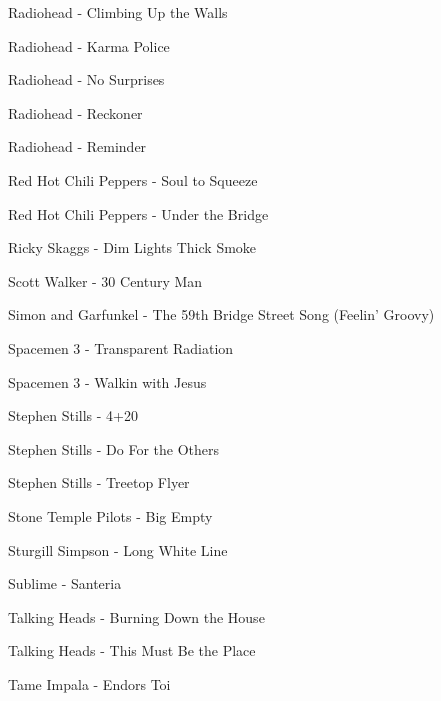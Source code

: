 Radiohead - Climbing Up the Walls \dotfill \pageref{Climbing Up the Walls - Radiohead} 

Radiohead - Karma Police \dotfill \pageref{Karma Police - Radiohead} 

Radiohead - No Surprises \dotfill \pageref{No Surprises - Radiohead} 

Radiohead - Reckoner \dotfill \pageref{Reckoner - Radiohead} 

Radiohead - Reminder \dotfill \pageref{Reminder - Radiohead} 

Red Hot Chili Peppers - Soul to Squeeze \dotfill \pageref{Soul to Squeeze - Red Hot Chili Peppers} 

Red Hot Chili Peppers - Under the Bridge \dotfill \pageref{Under the Bridge - Red Hot Chili Peppers} 

Ricky Skaggs - Dim Lights Thick Smoke \dotfill \pageref{Dim Lights Thick Smoke - Ricky Skaggs} 

Scott Walker - 30 Century Man \dotfill \pageref{30 Century Man - Scott Walker} 

Simon and Garfunkel - The 59th Bridge Street Song (Feelin' Groovy) \dotfill \pageref{The 59th Bridge Street Song (Feelin' Groovy) - Simon and Garfunkel} 

Spacemen 3 - Transparent Radiation \dotfill \pageref{Transparent Radiation - Spacemen 3} 

Spacemen 3 - Walkin with Jesus \dotfill \pageref{Walkin with Jesus - Spacemen 3} 

Stephen Stills - 4+20 \dotfill \pageref{4+20 - Stephen Stills} 

Stephen Stills - Do For the Others \dotfill \pageref{Do For the Others - Stephen Stills} 

Stephen Stills - Treetop Flyer \dotfill \pageref{Treetop Flyer - Stephen Stills} 

Stone Temple Pilots - Big Empty \dotfill \pageref{Big Empty - Stone Temple Pilots} 

Sturgill Simpson - Long White Line \dotfill \pageref{Long White Line - Sturgill Simpson} 

Sublime - Santeria \dotfill \pageref{Santeria - Sublime} 

Talking Heads - Burning Down the House \dotfill \pageref{Burning Down the House - Talking Heads} 

Talking Heads - This Must Be the Place \dotfill \pageref{This Must Be the Place - Talking Heads} 

Tame Impala - Endors Toi \dotfill \pageref{Endors Toi - Tame Impala} 

